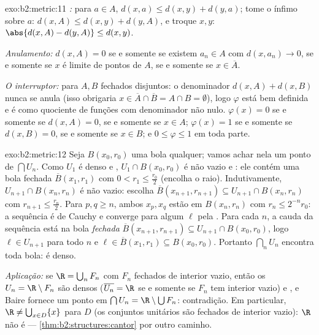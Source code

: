 \begin{solution}{exo:b2:metric:11}
\emph{:} para $a \in A$, $d(x, a) \leq d(x, y) + d(y,
a)$; tome o ínfimo sobre $a$: $d(x, A) \leq d(x, y) + d(y,
A)$, e troque $x, y$: $\abs{d(x,A) - d(y,A)} \leq d(x,y)$.

\emph{Anulamento:} $d(x, A) = 0$ se e somente se existem $a_n \in A$ com
$d(x, a_n) \to 0$, se e somente se $x$ é limite de pontos de $A$, se e somente se $x \in
\overline A$.

\emph{O interruptor:} para $A, B$ fechados disjuntos: o denominador
$d(x,A) + d(x,B)$ nunca se anula (isso obrigaria $x \in \overline
A \cap \overline B = A \cap B = \emptyset$), logo $\varphi$ está bem
definida e é  como quociente de funções 
com denominador não nulo. $\varphi(x) = 0$ se e somente se $d(x, A) = 0$,
se e somente se $x \in A$; $\varphi(x) = 1$ se e somente se $d(x, B) = 0$, se e somente se $x \in B$;
e $0 \leq \varphi \leq 1$ em toda parte.
\end{solution}

\begin{solution}{exo:b2:metric:12}
Seja $B(x_0, r_0)$ uma bola qualquer; vamos achar nela um ponto de $\bigcap U_n$.
Como $U_1$ é denso e , $U_1 \cap B(x_0, r_0)$ é
não vazio e : ele contém uma bola fechada $\overline B(x_1,
r_1)$ com $0 < r_1 \leq \frac{r_0}2$ (encolha o raio).
Indutivamente, $U_{n+1} \cap B(x_n, r_n)$ é  não vazio: escolha
$\overline B(x_{n+1}, r_{n+1}) \subseteq U_{n+1} \cap B(x_n,
r_n)$ com $r_{n+1} \leq \frac{r_n}2$. Para $p, q \geq n$, ambos
$x_p, x_q$ estão em $B(x_n, r_n)$ com $r_n \leq 2^{-n}r_0$: a
sequência é de Cauchy e converge para algum $\ell$ pela
. Para cada $n$, a cauda da sequência está na bola
\emph{fechada} $\overline B(x_{n+1}, r_{n+1}) \subseteq U_{n+1}
\cap B(x_0, r_0)$, logo $\ell \in U_{n+1}$ para todo $n$ e $\ell
\in \overline B(x_1, r_1) \subseteq B(x_0, r_0)$. Portanto
$\bigcap_n U_n$ encontra toda bola: é denso.

\emph{Aplicação:} se $\R = \bigcup_n F_n$ com $F_n$ fechados
de interior vazio, então os $U_n = \R \setminus F_n$ são densos
($\overline{U_n} = \R$ se e somente se $F_n$ tem interior vazio) e ,
e Baire fornece um ponto em $\bigcap U_n = \R \setminus \bigcup
F_n$: contradição. Em particular, $\R \neq \bigcup_{x \in D}
\{x\}$ para $D$  (os conjuntos unitários são fechados de interior
vazio): $\R$ não é  ---
\cref{thm:b2:structures:cantor} por outro caminho.
\end{solution}

